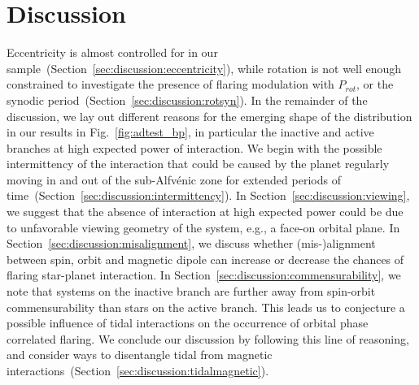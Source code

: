 \documentclass[twocolumn]{aastex631}
\begin{document}


\section{Discussion}
\label{sec:discussion}
Eccentricity is almost controlled for in our sample~(Section~\ref{sec:discussion:eccentricity}), while rotation is not well enough constrained to investigate the presence of flaring modulation with $P_{rot}$, or the synodic period~(Section~\ref{sec:discussion:rotsyn}). In the remainder of the discussion, we lay out different reasons for the emerging shape of the distribution in our results in Fig.~\ref{fig:adtest_bp}, in particular the inactive and active branches at high expected power of interaction. We begin with the possible intermittency of the interaction that could be caused by the planet regularly moving in and out of the sub-Alfv\'enic zone for extended periods of time~(Section~\ref{sec:discussion:intermittency}). In Section~\ref{sec:discussion:viewing}, we suggest that the absence of interaction at high expected power could be due to unfavorable viewing geometry of the system, e.g., a face-on orbital plane. In Section~\ref{sec:discussion:misalignment}, we discuss whether (mis-)alignment between spin, orbit and magnetic dipole can increase or decrease the chances of flaring star-planet interaction. In Section~\ref{sec:discussion:commensurability}, we note that systems on the inactive branch are further away from spin-orbit commensurability than stars on the active branch. This leads us to conjecture a possible influence of tidal interactions on the occurrence of orbital phase correlated flaring. We conclude our discussion by following this line of reasoning, and consider ways to disentangle tidal from magnetic interactions~(Section~\ref{sec:discussion:tidalmagnetic}).
\end{document}
